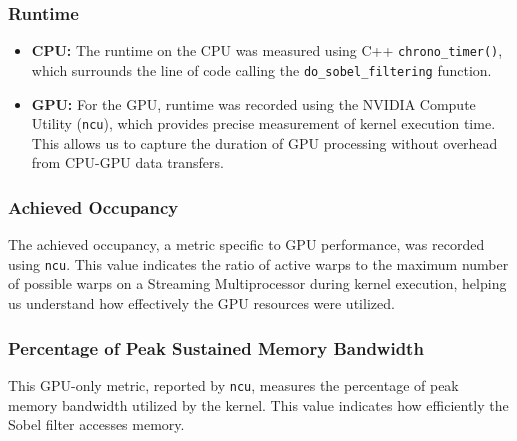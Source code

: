 \subsubsection{Runtime}
\label{subsubsec:runtime}
\begin{itemize}
    \item \textbf{CPU:} The runtime on the CPU was measured using C++ \texttt{chrono\_timer()}, which surrounds the line of code calling the \texttt{do\_sobel\_filtering} function.
    \item \textbf{GPU:} For the GPU, runtime was recorded using the NVIDIA Compute Utility (\texttt{ncu}), which provides precise measurement of kernel execution time. This allows us to capture the duration of GPU processing without overhead from CPU-GPU data transfers.
\end{itemize}

\subsubsection{Achieved Occupancy}
\label{subsubsec:occupancy}
The achieved occupancy, a metric specific to GPU performance, was recorded using \texttt{ncu}. This value indicates the ratio of active warps to the maximum number of possible warps on a Streaming Multiprocessor during kernel execution, helping us understand how effectively the GPU resources were utilized.

\subsubsection{Percentage of Peak Sustained Memory Bandwidth}
\label{subsubsec:bandwidth}
This GPU-only metric, reported by \texttt{ncu}, measures the percentage of peak memory bandwidth utilized by the kernel. This value indicates how efficiently the Sobel filter accesses memory.

